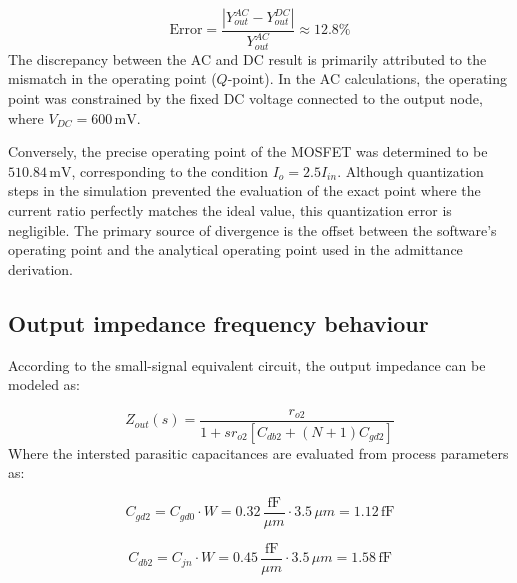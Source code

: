 \begin{equation*}
\text{Error} = \frac{|Y_{out}^{AC} - Y_{out}^{DC}|}{Y_{out}^{AC}} \approx 12.8\%
\end{equation*}
The discrepancy between the AC and DC result is primarily 
attributed to the mismatch in the operating point ($Q$-point). In the AC 
calculations, the operating point was constrained by the fixed DC voltage 
connected to the output node, where $V_{DC} = 600 \, \text{mV}$. 

Conversely, the precise operating point of the MOSFET was determined to be 
$510.84 \, \text{mV}$, corresponding to the condition $I_o = 2.5 I_{in}$. 
Although quantization steps in the simulation prevented the evaluation of the 
exact point where the current ratio perfectly matches the ideal value, this 
quantization error is negligible. The primary source of divergence is the 
offset between the software's operating point and the analytical operating 
point used in the admittance derivation.
\subsection{Output impedance frequency behaviour}
According to the small-signal equivalent circuit, the output impedance can be modeled as:

\begin{equation*}
Z_{out}(s)=\frac{r_{o2}}{1+s r_{o2}[C_{db2}+(N+1)C_{gd2}]}
\end{equation*}
Where the intersted parasitic capacitances are evaluated from process parameters as:

\begin{equation*}
C_{gd2} = C_{gd0}\cdot W = 0.32\,\frac{\text{fF}}{\mu m} \cdot 3.5\,\mu m = 1.12\,\text{fF}
\end{equation*}

\begin{equation*}
C_{db2} = C_{jn}\cdot W = 0.45\,\frac{\text{fF}}{\mu m} \cdot 3.5\,\mu m =1.58\,\text{fF}
\end{equation*}

